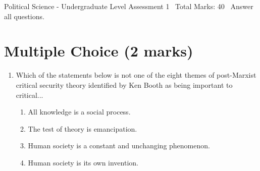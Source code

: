 \documentclass[12pt]{article}
\begin{document}
\begin{center}
Political Science - Undergraduate Level Assessment 1 \
Total Marks: 40 \
Answer all questions.
\end{center}

\section*{Multiple Choice (2 marks)}
\begin{enumerate}[label=\arabic*.]
\item Which of the statements below is not one of the eight themes of post-Marxist critical security theory identified by Ken Booth as being important to critical...
\begin{enumerate}[label=(\alph*)]
    \item All knowledge is a social process.
    \item The test of theory is emancipation.
    \item Human society is a constant and unchanging phenomenon.
    \item Human society is its own invention.
\end{enumerate}
\end{enumerate}
\end{document}
